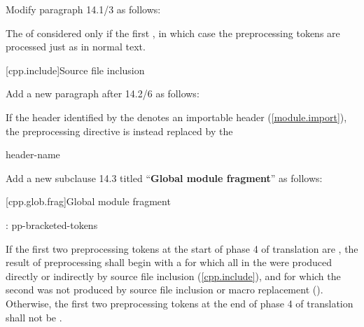 Modify paragraph 14.1/3 as follows:

\begin{std.txt}
\resetalinea[2]
\alinea
The 
of 
  considered
only if  the first 
,
in which case the preprocessing tokens are processed just as in normal text.
\end{std.txt}

\setcounter{section}{1}
[cpp.include]{Source file inclusion}%

\begin{after}
Add a new paragraph after 14.2/6 as follows:

\begin{std.txt}
\resetalinea[6]
\color{addclr}
\alinea
If the header identified by the 
denotes an importable header (\ref{module.import}),
the preprocessing directive
is instead replaced by the 

\begin{bnf}
 header-name \terminal{;}
\end{bnf}
\end{std.txt}
\end{after}

\noindent
Add a new subclause 14.3 titled ``\textbf{Global module fragment}'' as follows:

\setcounter{section}{2}
[cpp.glob.frag]{Global module fragment}%
\resetalinea[0]

\begin{std.txt}
\color{addclr}
\begin{bnf}
:\br
   \terminal{;} pp-bracketed-tokens 
\end{bnf}

\alinea
If the first two preprocessing tokens at the start of phase 4 of translation
are  \tcode{;}, the result of preprocessing shall begin with
a  for which all
 in the 
were produced directly or indirectly by source file inclusion
(\ref{cpp.include}), and for which the second 
 was not produced by source file inclusion or
macro replacement ().
Otherwise, the first two preprocessing tokens at the end of phase 4 of
translation shall not be  \tcode{;}.
\end{std.txt}

